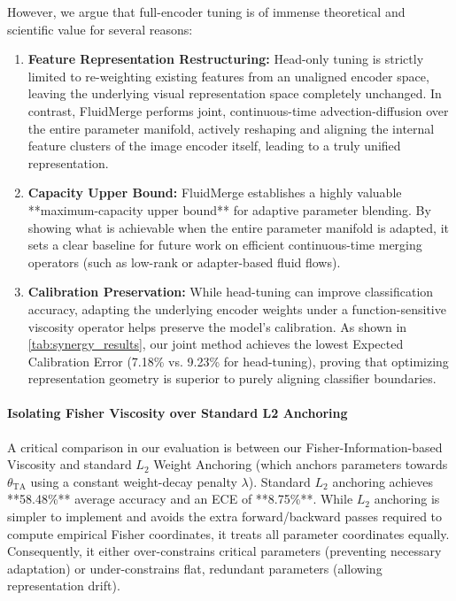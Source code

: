 However, we argue that full-encoder tuning is of immense theoretical and scientific value for several reasons:
\begin{enumerate}
    \item \textbf{Feature Representation Restructuring:} Head-only tuning is strictly limited to re-weighting existing features from an unaligned encoder space, leaving the underlying visual representation space completely unchanged. In contrast, FluidMerge performs joint, continuous-time advection-diffusion over the entire parameter manifold, actively reshaping and aligning the internal feature clusters of the image encoder itself, leading to a truly unified representation.
    \item \textbf{Capacity Upper Bound:} FluidMerge establishes a highly valuable **maximum-capacity upper bound** for adaptive parameter blending. By showing what is achievable when the entire parameter manifold is adapted, it sets a clear baseline for future work on efficient continuous-time merging operators (such as low-rank or adapter-based fluid flows).
    \item \textbf{Calibration Preservation:} While head-tuning can improve classification accuracy, adapting the underlying encoder weights under a function-sensitive viscosity operator helps preserve the model's calibration. As shown in \cref{tab:synergy_results}, our joint method achieves the lowest Expected Calibration Error (7.18\% vs. 9.23\% for head-tuning), proving that optimizing representation geometry is superior to purely aligning classifier boundaries.
\end{enumerate}

\paragraph{Isolating Fisher Viscosity over Standard L2 Anchoring}
A critical comparison in our evaluation is between our Fisher-Information-based Viscosity and standard $L_2$ Weight Anchoring (which anchors parameters towards $\theta_{\text{TA}}$ using a constant weight-decay penalty $\lambda$). 
Standard $L_2$ anchoring achieves **58.48\%** average accuracy and an ECE of **8.75\%**. While $L_2$ anchoring is simpler to implement and avoids the extra forward/backward passes required to compute empirical Fisher coordinates, it treats all parameter coordinates equally. Consequently, it either over-constrains critical parameters (preventing necessary adaptation) or under-constrains flat, redundant parameters (allowing representation drift). 

